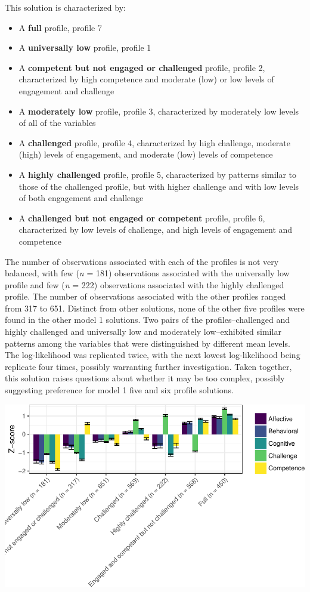 \documentclass[]{msu-thesis}
\providecommand{\tightlist}{%
  \setlength{\itemsep}{0pt}\setlength{\parskip}{0pt}}
\theoremstyle{definition}
\theoremstyle{definition}
\theoremstyle{definition}
\theoremstyle{remark}
\begin{document}
This solution is characterized by:

\begin{itemize}
\tightlist
\item
  A \textbf{full} profile, profile 7
\item
  A \textbf{universally low} profile, profile 1
\item
  A \textbf{competent but not engaged or challenged} profile, profile 2,
  characterized by high competence and moderate (low) or low levels of
  engagement and challenge
\item
  A \textbf{moderately low} profile, profile 3, characterized by
  moderately low levels of all of the variables
\item
  A \textbf{challenged} profile, profile 4, characterized by high
  challenge, moderate (high) levels of engagement, and moderate (low)
  levels of competence
\item
  A \textbf{highly challenged} profile, profile 5, characterized by
  patterns similar to those of the challenged profile, but with higher
  challenge and with low levels of both engagement and challenge
\item
  A \textbf{challenged but not engaged or competent} profile, profile 6,
  characterized by low levels of challenge, and high levels of
  engagement and competence
\end{itemize}

The number of observations associated with each of the profiles is not
very balanced, with few (\emph{n} = 181) observations associated with
the universally low profile and few (\emph{n} = 222) observations
associated with the highly challenged profile. The number of
observations associated with the other profiles ranged from 317 to 651.
Distinct from other solutions, none of the other five profiles were
found in the other model 1 solutions. Two pairs of the
profiles--challenged and highly challenged and universally low and
moderately low--exhibited similar patterns among the variables that were
distinguished by different mean levels. The log-likelihood was
replicated twice, with the next lowest log-likelihood being replicate
four times, possibly warranting further investigation. Taken together,
this solution raises questions about whether it may be too complex,
possibly suggesting preference for model 1 five and six profile
solutions.

\begin{center}\includegraphics[width=0.8\linewidth]{rosenberg-dissertation_files/figure-latex/m1_7p-1} \end{center}
\end{document}
